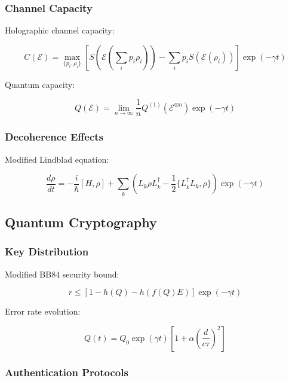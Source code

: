 \documentclass[12pt]{article}
\theoremstyle{plain}
\theoremstyle{definition}
\theoremstyle{remark}
\begin{document}
\subsubsection{Channel Capacity}

Holographic channel capacity:

\begin{equation}
C(\mathcal{E}) = \max_{\{p_i,\rho_i\}} \left[S(\mathcal{E}(\sum_i p_i\rho_i)) - \sum_i p_iS(\mathcal{E}(\rho_i))\right]\exp(-\gamma t)
\end{equation}

Quantum capacity:

\begin{equation}
Q(\mathcal{E}) = \lim_{n\to\infty} \frac{1}{n}Q^{(1)}(\mathcal{E}^{\otimes n})\exp(-\gamma t)
\end{equation}

\subsubsection{Decoherence Effects}

Modified Lindblad equation:

\begin{equation}
\frac{d\rho}{dt} = -\frac{i}{\hbar}[H,\rho] + \sum_k \left(L_k\rho L_k^\dagger - \frac{1}{2}\{L_k^\dagger L_k,\rho\}\right)\exp(-\gamma t)
\end{equation}

\subsection{Quantum Cryptography}

\subsubsection{Key Distribution}

Modified BB84 security bound:

\begin{equation}
r \leq [1 - h(Q) - h(f(Q)E)]\exp(-\gamma t)
\end{equation}

Error rate evolution:

\begin{equation}
Q(t) = Q_0\exp(\gamma t)\left[1 + \alpha\left(\frac{d}{c\tau}\right)^2\right]
\end{equation}

\subsubsection{Authentication Protocols}
\end{document}

